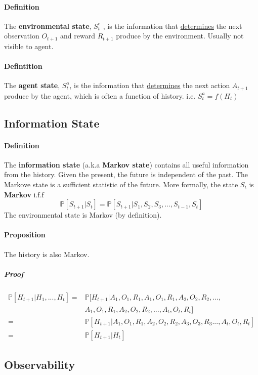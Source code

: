 \documentclass{article}
\begin{document}
	\paragraph{Definition} The \textbf{environmental state}, $S^e_t$ , is the information that \underline{determines} the next observation $O_{t+1}$ and reward $R_{t+1}$ produce by the environment. Usually not visible to agent.
	
	\paragraph{Defintition} The \textbf{agent state}, $S^a_t$, is the information that \underline{determines} the next action $A_{t+1}$ produce by the agent, which is often a function of history. i.e. $S^a_t = f(H_t)$
	
	\subsection{Information State}
	\paragraph{Definition} The \textbf{information state} (a.k.a \textbf{Markov state}) contains all useful information from the history. Given the present, the future is independent of the past. The Markove state is a sufficient statistic of the future.  More formally, the state $S_t$ is \textbf{Markov} i.f.f 
	\begin{equation}
	\mathbb{P} [S_{t+1} | S_t] = \mathbb{P} [S_{t+1} | S_1, S_2, S_3, ..., S_{t-1}, S_t]
	\end{equation}
	The environmental state is Markov (by definition). 
	\paragraph{Proposition} The history is also Markov. 
	\subparagraph{Proof}
	\begin{align*}
	\mathbb{P} [H_{t+1} | H_1, ..., H_t]
	=  &\mathbb{P} [H_{t+1} | A_1, O_1, R_1, A_1, O_1, R_1, A_2, O_2, R_2, ... ,\\
	&A_1, O_1, R_1, A_2, O_2, R_2, ..., A_t, O_t, R_t ] \\
	= &\mathbb{P} [H_{t+1} | A_1, O_1, R_1, A_2, O_2, R_2, A_3, O_3, R_3 ..., A_t, O_t, R_t ] \\
	= &\mathbb{P} [H_{t+1} | H_t]
	\end{align*} 
	
	\subsection{Observability}
	
\end{document}
